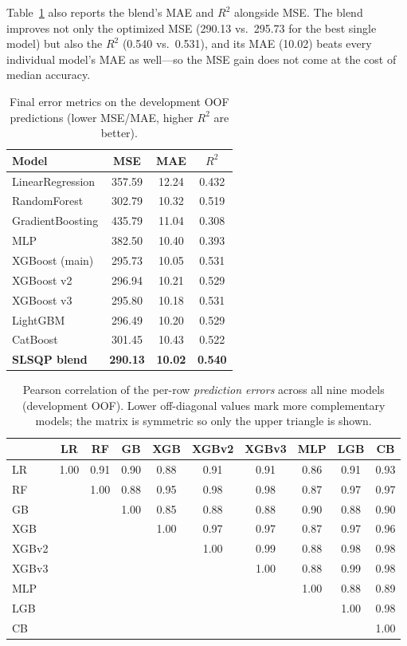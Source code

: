 \documentclass[journal]{IEEEtran}
\begin{document}
Table~\ref{tab:metrics} also reports the blend's MAE and $R^2$ alongside MSE.
The blend improves not only the optimized MSE (290.13 vs.\ 295.73 for the best
single model) but also the $R^2$ (0.540 vs.\ 0.531), and its MAE (10.02) beats
every individual model's MAE as well---so the MSE gain does not come at the
cost of median accuracy.

\begin{table}[!t]
\caption{Final error metrics on the development OOF predictions (lower MSE/MAE,
higher $R^2$ are better).}
\label{tab:metrics}
\centering
\begin{tabular}{lccc}
\toprule
Model & MSE & MAE & $R^2$ \\
\midrule
LinearRegression & 357.59 & 12.24 & 0.432 \\
RandomForest & 302.79 & 10.32 & 0.519 \\
GradientBoosting & 435.79 & 11.04 & 0.308 \\
MLP & 382.50 & 10.40 & 0.393 \\
XGBoost (main) & 295.73 & 10.05 & 0.531 \\
XGBoost v2 & 296.94 & 10.21 & 0.529 \\
XGBoost v3 & 295.80 & 10.18 & 0.531 \\
LightGBM & 296.49 & 10.20 & 0.529 \\
CatBoost & 301.45 & 10.43 & 0.522 \\
\textbf{SLSQP blend} & \textbf{290.13} & \textbf{10.02} & \textbf{0.540} \\
\bottomrule
\end{tabular}
\end{table}

\begin{table}[!t]
\caption{Pearson correlation of the per-row \emph{prediction errors} across all
nine models (development OOF). Lower off-diagonal values mark more
complementary models; the matrix is symmetric so only the upper triangle is
shown.}
\label{tab:errcorr}
\centering
\begin{tabular}{lccccccccc}
\toprule
 & LR & RF & GB & XGB & XGBv2 & XGBv3 & MLP & LGB & CB \\
\midrule
LR    & 1.00 & 0.91 & 0.90 & 0.88 & 0.91 & 0.91 & 0.86 & 0.91 & 0.93 \\
RF    &      & 1.00 & 0.88 & 0.95 & 0.98 & 0.98 & 0.87 & 0.97 & 0.97 \\
GB    &      &      & 1.00 & 0.85 & 0.88 & 0.88 & 0.90 & 0.88 & 0.90 \\
XGB   &      &      &      & 1.00 & 0.97 & 0.97 & 0.87 & 0.97 & 0.96 \\
XGBv2 &      &      &      &      & 1.00 & 0.99 & 0.88 & 0.98 & 0.98 \\
XGBv3 &      &      &      &      &      & 1.00 & 0.88 & 0.99 & 0.98 \\
MLP   &      &      &      &      &      &      & 1.00 & 0.88 & 0.89 \\
LGB   &      &      &      &      &      &      &      & 1.00 & 0.98 \\
CB    &      &      &      &      &      &      &      &      & 1.00 \\
\bottomrule
\end{tabular}
\end{table}
\end{document}
